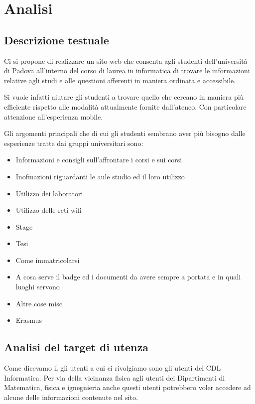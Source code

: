 \section{Analisi}
\subsection{Descrizione testuale}

Ci si propone di realizzare un sito web che consenta agli studenti dell'università di Padova all'interno del corso di laurea in informatica di trovare le informazioni relative agli studi e alle questioni afferenti in maniera ordinata e accessibile.

Si vuole infatti aiutare gli studenti a trovare quello che cercano in maniera più efficiente rispetto alle modalità attualmente fornite dall'ateneo. Con particolare attenzione all'esperienza mobile.

Gli argomenti principali che di cui gli studenti sembrano aver più bisogno dalle esperienze tratte dai gruppi universitari sono:
\begin{itemize}
    \item Informazioni e consigli sull'affrontare i corsi e sui corsi %
    \item Inofmazioni riguardanti le aule studio ed il loro utilizzo
    \item Utilizzo dei laboratori
    \item Utilizzo delle reti wifi
    \item Stage
    \item Tesi
    \item Come immatricolarsi %
    \item A cosa serve il badge ed i documenti da avere sempre a portata e in quali luoghi servono%
    \item Altre cose misc
    \item Erasmus
\end{itemize}

\subsection{Analisi del target di utenza}

Come dicevamo il gli utenti a cui ci rivolgiamo sono gli utenti del CDL Informatica. Per via della vicinanza fisica agli utenti dei Dipartimenti di Matematica, fisica e ignegnieria anche questi utenti potrebbero voler accedere ad alcune delle informazioni contenute nel sito.


